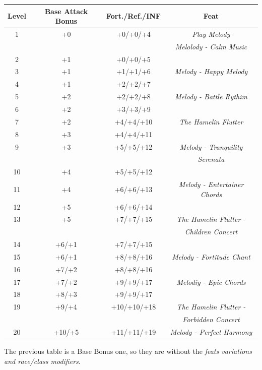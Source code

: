 \documentclass[ letterpaper,12pt]{article}
\begin{document}
\begin{center} \begin{tabular}{|c||c|c|c|}
\hline
{\bf Level}&{\bf Base Attack Bonus}&{\bf Fort./Ref./INF}&{\bf Feat}\\
\hline
1&+0&+0/+0/+4&{\it Play Melody}\\
&&&{\it Melolody - Calm Music}\\
\hline
2&+1&+0/+0/+5&\\
\hline
3&+1&+1/+1/+6&{\it Melody - Happy Melody}\\
\hline
4&+1&+2/+2/+7&\\
\hline
5&+2&+2/+2/+8&{\it Melody - Battle Rythim}\\
\hline
6&+2&+3/+3/+9&\\
\hline
7&+2&+4/+4/+10&{\it The Hamelin Flutter}\\
\hline
8&+3&+4/+4/+11&\\
\hline
9&+3&+5/+5/+12&{\it Melody - Tranquility}\\
 & & & {\it Serenata}\\
\hline
10&+4&+5/+5/+12&\\
\hline
11&+4&+6/+6/+13&{\it Melody - Entertainer Chords}\\
\hline
12&+5&+6/+6/+14&\\
\hline
13&+5&+7/+7/+15&{\it The Hamelin Flutter -}\\
&&&{\it Children Concert}\\
\hline
14&+6/+1&+7/+7/+15&\\
\hline
15&+6/+1&+8/+8/+16&{\it Melody - Fortitude Chant}\\
\hline
16&+7/+2&+8/+8/+16&\\
\hline
17&+7/+2&+9/+9/+17&{\it Melodiy - Epic Chords}\\
\hline
18&+8/+3&+9/+9/+17&\\
\hline
19&+9/+4&+10/+10/+18&{\it The Hamelin Flutter -}\\
&&&{\it Forbidden Concert}\\
\hline
20&+10/+5&+11/+11/+19&{\it Melody - Perfect Harmony}\\
\hline
\end{tabular} \end{center}

The previous table is a Base Bonus one, so they are without the {\it feats variations and race/class modifiers}.\\
\end{document}
